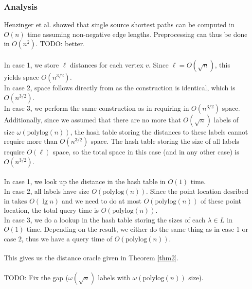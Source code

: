 \subsubsection{Analysis}
Henzinger et al. showed that single source shortest paths can be computed in $O(n)$ time
\cite{henzinger1997faster} assuming non-negative edge lengths. Preprocessing can thus be done in $O(n^2)$. TODO: better. \\
\\
In case 1, we store $\ell$ distances for each vertex $v$. Since $\ell=O(\sqrt{n})$, this
yields space $O(n^{3/2})$. \\
In case 2, space follows directly from \cite{gawrychowski2017better} as the construction
is identical, which is $O(n^{3/2})$. \\
In case 3, we perform the same construction as in \cite{gawrychowski2017better} requiring
in $O(n^{3/2})$ space. Additionally, since we assumed that there are no more that
$O(\sqrt{n})$ labels of size $\omega(\text{polylog}(n))$, the hash table storing the
distances to these labels cannot require more than $O(n^{3/2})$ space. The hash table
storing the size of all labels require $O(\ell)$ space, so the total space
in this case (and in any other case) is $O(n^{3/2})$.\\
\\
In case 1, we look up the distance in the hash table in $O(1)$ time.\\
In case 2, all labels have size $O(\text{polylog}(n))$. Since the point location desribed
in \cite{gawrychowski2017better} takes $O(\lg n)$ and we need to do at most
$O(\text{polylog}(n))$ of these point location, the total query time is
$O(\text{polylog}(n))$. \\
In case 3, we do a lookup in the hash table storing the sizes of each $\lambda\in L$ in
$O(1)$ time. Depending on the result, we either do the same thing as in case 1 or case 2,
thus we have a query time of $O(\text{polylog}(n))$. \\
\\
This gives us the distance oracle given in Theorem \ref{thm2}. \\
\\
TODO: Fix the gap ($\omega(\sqrt{n})$ labels with $\omega(\text{polylog}(n))$ size).
